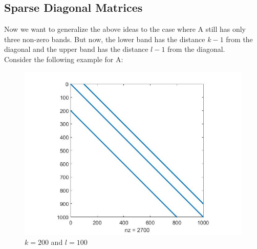\documentclass{article}
\numberwithin{pic}{section}
\numberwithin{lem}{section}
\numberwithin{thm}{section}
\numberwithin{cor}{section}
\theoremstyle{definition}
\numberwithin{ex}{section}
\numberwithin{defn}{section}
\theoremstyle{definition}
\theoremstyle{remark}
\begin{document}
\subsection{Sparse Diagonal Matrices}
Now we want to generalize the above ideas to the case where A still has only three non-zero bands.
But now, the lower band has the distance $k-1$ from the diagonal and the upper band has the distance $l-1$ from the diagonal.\\
Consider the following example for A: 
\begin{figure}[	H]
\includegraphics[scale=0.3]{example1.jpg}
\caption{$k=200$ and $l=100$}
\end{figure}
\end{document}

